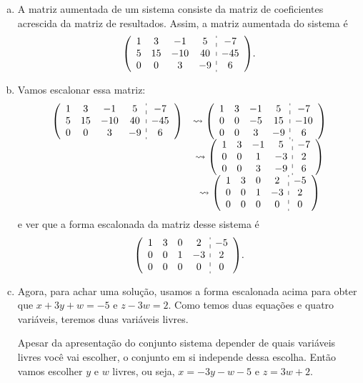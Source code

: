 \documentclass[a4paper,12pt]{article}
\newenvironment{sol}{\begin{tcolorbox}[breakable,colback=blue!5!white,colframe=blue!40!white,title=\normalsize {\sc{Solução}},coltitle=black]}{\end{tcolorbox}}
\newenvironment{augmatrix}{\left(\begin{array}}{\end{array}\right)}
\begin{document}
\begin{sol}
	\begin{enumerate}[a)]		
		\item A matriz aumentada de um sistema consiste da matriz de coeficientes acrescida da matriz de resultados. Assim, a matriz aumentada do sistema é
		\[\begin{augmatrix}{cccc:c}
			1&3&-1&5&-7\\
			5&15&-10&40&-45\\
			0&0&3&-9&6
		\end{augmatrix}.\]
		\item Vamos escalonar essa matriz:
		\[\begin{array}{cc}
			\begin{augmatrix}{cccc:c}
			1&3&-1&5&-7\\
			5&15&-10&40&-45\\
			0&0&3&-9&6
			\end{augmatrix}&\rightsquigarrow\begin{augmatrix}{cccc:c}
			1&3&-1&5&-7\\
			0&0&-5&15&-10\\
			0&0&3&-9&6
			\end{augmatrix}\\&\rightsquigarrow\begin{augmatrix}{cccc:c}
			1&3&-1&5&-7\\
			0&0&1&-3&2\\
			0&0&3&-9&6
			\end{augmatrix}\\&\rightsquigarrow\begin{augmatrix}{cccc:c}
			1&3&0&2&-5\\
			0&0&1&-3&2\\
			0&0&0&0&0
			\end{augmatrix}
		\end{array}\] e ver que a forma escalonada da matriz desse sistema é
		\[\begin{augmatrix}{cccc:c}
		1&3&0&2&-5\\
		0&0&1&-3&2\\
		0&0&0&0&0
		\end{augmatrix}.\]
		\item Agora, para achar uma solução, usamos a forma escalonada acima para obter que $x+3y+w=-5$ e $z-3w=2$. Como temos duas equações e quatro variáveis, teremos duas variáveis livres.
		
		Apesar da apresentação do conjunto sistema depender de quais variáveis livres você vai escolher, o conjunto em si independe dessa escolha. Então vamos escolher $y$ e $w$ livres, ou seja, $x=-3y-w-5$ e $z=3w+2$.
	

\end{enumerate}
\end{sol}
\end{document}
